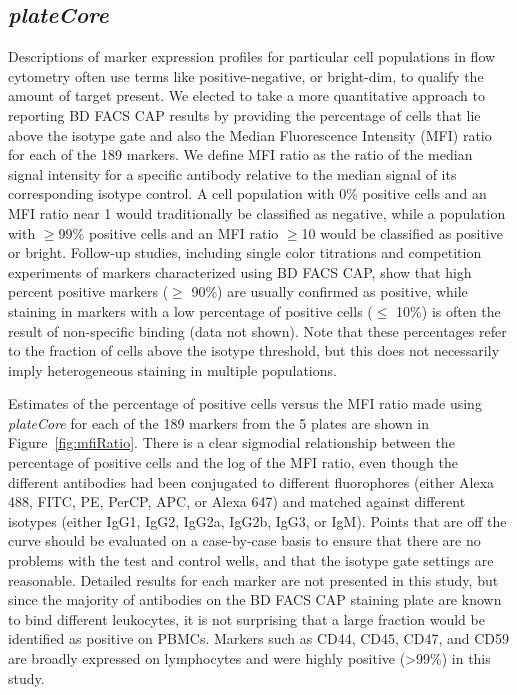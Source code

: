 \documentclass[12pt]{article}
\newcommand{\Rpackage}[1]{{\textit{#1}}}
\begin{document}
\subsection*{\Rpackage{plateCore}}

Descriptions of marker expression profiles for particular cell populations in
flow cytometry often use terms like positive-negative, or bright-dim, to
qualify the amount of target present. We elected to take a more quantitative
approach to reporting BD FACS CAP results by providing the percentage of cells
that lie above the isotype gate and also the Median Fluorescence Intensity (MFI)
ratio for each of the 189 markers. We define MFI ratio as the ratio of
the median signal intensity for a specific antibody relative to the median
signal of its corresponding isotype control. A cell population with 0\%
positive cells and an MFI ratio near 1 would traditionally be classified as
negative, while a population with $\ge$99\% positive cells and an MFI ratio
$\ge$10 would be classified as positive or bright. Follow-up studies, including
single color titrations and competition experiments of markers characterized
using BD FACS CAP, show that high percent positive markers ($\ge$ 90\%) are
usually confirmed as positive, while staining in markers with a low percentage
of positive cells ($\le$ 10\%) is often the result of non-specific binding (data
not shown). Note that these percentages refer to the fraction of cells above
the isotype threshold, but this does not necessarily imply heterogeneous
staining in multiple populations.

Estimates of the percentage of positive cells versus the MFI ratio made using
\Rpackage{plateCore} for each of the 189 markers from the 5 plates are shown
in Figure~\ref{fig:mfiRatio}. There is a clear sigmodial relationship
between the percentage of positive cells and the log of the MFI ratio, even
though the different antibodies had been conjugated to different fluorophores
(either Alexa 488, FITC, PE, PerCP, APC, or Alexa 647) and matched against
different isotypes (either IgG1, IgG2, IgG2a, IgG2b, IgG3, or IgM). Points that
are off the curve should be evaluated on a case-by-case basis to ensure that
there are no problems with the test and control wells, and that the isotype
gate settings are reasonable. Detailed results for each marker are not
presented in this study, but since the majority of antibodies on the BD FACS
CAP staining plate are known to bind different leukocytes, it is not surprising
that a large fraction would be identified as positive on PBMCs. Markers such as
CD44, CD45, CD47, and CD59 are broadly expressed on lymphocytes and were highly
positive (>99\%) in this study.
\end{document}
